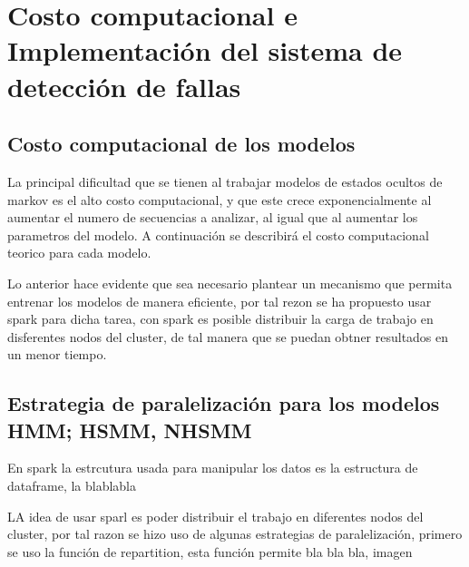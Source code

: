 \chapter{Costo computacional e Implementación del sistema de detección de fallas}

\ifpdf
    \graphicspath{{Chapter3/Figs/Raster/}{Chapter3/Figs/PDF/}{Chapter3/Figs/}}
\else
    \graphicspath{{Chapter3/Figs/Vector/}{Chapter3/Figs/}}
\fi

\section{Costo computacional de los modelos} %
\label{section3.1}


La principal dificultad que se tienen al trabajar modelos de estados ocultos de markov es el alto costo computacional, y que este crece exponencialmente al aumentar el numero de secuencias a analizar, al igual que al aumentar los parametros del modelo. A continuación se describirá el costo computacional teorico para cada modelo. 




Lo anterior hace evidente que sea necesario plantear un mecanismo que permita entrenar los modelos de manera eficiente, por tal rezon se ha propuesto usar spark para dicha tarea, con spark es posible distribuir la carga de trabajo en disferentes nodos del cluster, de tal manera que se puedan obtner resultados en un menor tiempo. 

\section{Estrategia de paralelización para los modelos HMM; HSMM, NHSMM } %
\label{section3.2}

En spark la estrcutura usada para manipular los datos es la estructura de dataframe, la blablabla

LA idea de usar sparl es poder distribuir el trabajo en diferentes nodos del cluster, por tal razon se hizo uso de algunas estrategias de paralelización, 
primero se uso la función de repartition, esta función permite bla bla bla, imagen

